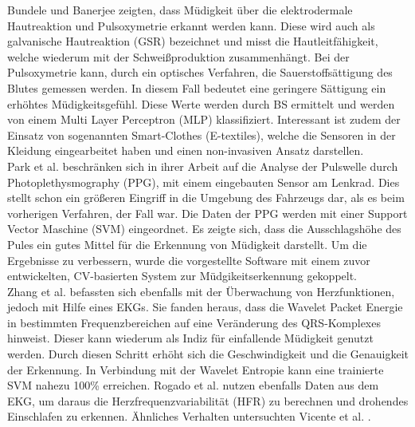 {Bundele und Banerjee \citep{Bundele:2009:DFV:1806338.1806478} zeigten, dass Müdigkeit über die elektrodermale Hautreaktion und Pulsoxymetrie erkannt werden kann. Diese wird auch als galvanische Hautreaktion (GSR) bezeichnet und misst die Hautleitfähigkeit, welche wiederum mit der Schweißproduktion zusammenhängt. Bei der Pulsoxymetrie kann, durch ein optisches Verfahren, die Sauerstoffsättigung des Blutes gemessen werden. In diesem Fall bedeutet eine geringere Sättigung ein erhöhtes Müdigkeitsgefühl. Diese Werte werden durch \acl{BS} ermittelt und werden von einem Multi Layer Perceptron (MLP) klassifiziert. Interessant ist zudem der Einsatz von sogenannten Smart-Clothes (E-textiles), welche die Sensoren in der Kleidung eingearbeitet haben und einen non-invasiven Ansatz darstellen.\\

Park et al. \cite{Park:2009:DDD:1667780.1667798} beschränken sich in ihrer Arbeit auf die Analyse der Pulswelle durch Photoplethysmography (PPG), mit einem eingebauten Sensor am Lenkrad. Dies stellt schon ein größeren Eingriff in die Umgebung des Fahrzeugs dar, als es beim vorherigen Verfahren, der Fall war. Die Daten der PPG werden mit einer Support Vector Maschine (SVM) eingeordnet. Es zeigte sich, dass die Ausschlagshöhe des Pules ein gutes Mittel für die Erkennung von Müdigkeit darstellt. Um die Ergebnisse zu verbessern, wurde die vorgestellte Software mit einem zuvor entwickelten, CV-basierten System zur Müdgikeitserkennung gekoppelt. \\

Zhang et al. \cite{zhang_6513058} befassten sich ebenfalls mit der Überwachung von Herzfunktionen, jedoch mit Hilfe eines EKGs. Sie fanden heraus, dass die Wavelet Packet Energie in bestimmten Frequenzbereichen auf eine Veränderung des QRS-Komplexes hinweist. Dieser kann wiederum als Indiz für einfallende Müdigkeit genutzt werden. Durch diesen Schritt erhöht sich  die Geschwindigkeit und die Genauigkeit der Erkennung. In Verbindung mit der Wavelet Entropie kann eine trainierte SVM nahezu 100\% erreichen. Rogado et al. \cite{Rogado_4913155} nutzen ebenfalls Daten aus dem EKG, um daraus die Herzfrequenzvariabilität (HFR) zu berechnen und drohendes Einschlafen zu erkennen. Ähnliches Verhalten untersuchten Vicente et al. \cite{Vicente_6164509}. \\

}
